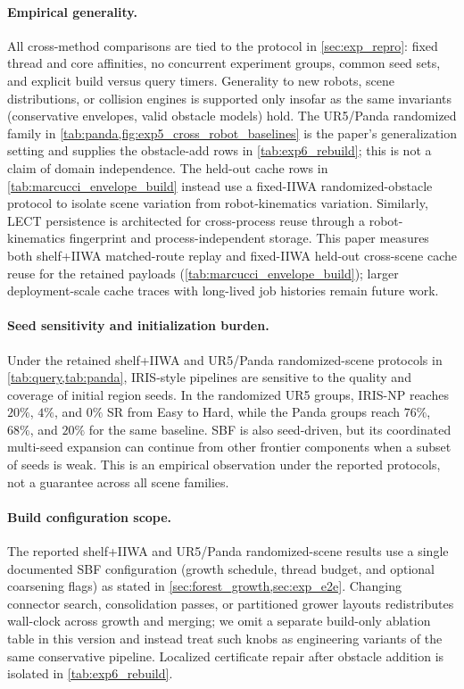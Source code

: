\documentclass[journal]{IEEEtran}
\begin{document}
\paragraph{Empirical generality.}
All cross-method comparisons are tied to the protocol in
\cref{sec:exp_repro}: fixed thread and core affinities, no concurrent
experiment groups, common seed sets, and explicit build versus query timers.
Generality to new robots, scene distributions, or collision engines is
supported only insofar as the same invariants (conservative envelopes, valid
obstacle models) hold. The UR5/Panda randomized family in
\cref{tab:panda,fig:exp5_cross_robot_baselines} is the paper's generalization
setting and supplies the obstacle-add rows in \cref{tab:exp6_rebuild}; this is
not a claim of domain independence. The held-out cache rows in
\cref{tab:marcucci_envelope_build} instead use a fixed-IIWA randomized-obstacle
protocol to isolate scene variation from robot-kinematics variation. Similarly,
LECT persistence is architected for cross-process reuse through a
robot-kinematics fingerprint and process-independent storage. This paper
measures both shelf+IIWA matched-route replay and fixed-IIWA held-out
cross-scene cache reuse for the retained payloads
(\cref{tab:marcucci_envelope_build}); larger deployment-scale cache traces with
long-lived job histories remain future work.

\paragraph{Seed sensitivity and initialization burden.}
Under the retained shelf+IIWA and UR5/Panda randomized-scene protocols in
\cref{tab:query,tab:panda}, IRIS-style pipelines are sensitive to the quality
and coverage of initial region seeds. In the randomized UR5 groups,
IRIS-NP reaches $20\%$, $4\%$, and $0\%$ SR from Easy to Hard, while the Panda
groups reach $76\%$, $68\%$, and $20\%$ for the same baseline. SBF is also seed-driven, but its
coordinated multi-seed expansion can continue from other frontier components
when a subset of seeds is weak. This is an empirical observation under the
reported protocols, not a guarantee across all scene families.

\paragraph{Build configuration scope.}
The reported shelf+IIWA and UR5/Panda randomized-scene results use a single documented SBF configuration (growth schedule, thread budget, and optional coarsening flags) as stated in \cref{sec:forest_growth,sec:exp_e2e}.
Changing connector search, consolidation passes, or partitioned grower layouts redistributes wall-clock across growth and merging; we omit a separate build-only ablation table in this version and instead treat such knobs as engineering variants of the same conservative pipeline.
Localized certificate repair after obstacle addition is isolated in \cref{tab:exp6_rebuild}.
\end{document}
